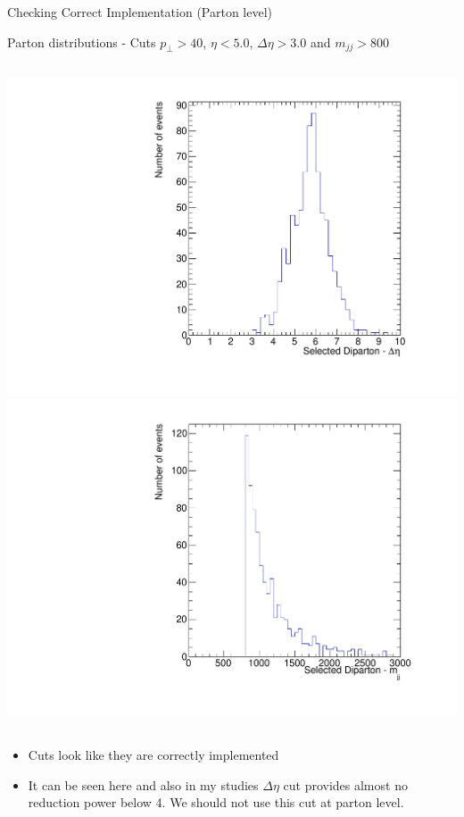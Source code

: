 \documentclass[8pt]{beamer}
\begin{document}
\begin{frame}{Checking Correct Implementation (Parton level)}
\begin{block}{Parton distributions - Cuts $p_\perp>40$, $\eta<5.0$, $\Delta\eta>3.0$ and $m_{jj}>800$}
\begin{columns}
  \centering
  \includegraphics[width=0.8\linewidth]{img/SelDiParton_DEta.pdf} \\
  \includegraphics[width=0.8\linewidth]{img/SelDiParton_Mjj.pdf}

\end{columns}
  
\end{block}
  
\tiny
\begin{itemize}
  \item Cuts look like they are correctly implemented
  \item It can be seen here and also in my studies $\Delta\eta$ cut provides almost no reduction power below 4. We should not use this cut at parton level.
\end{itemize}
  
\end{frame}
\end{document}
